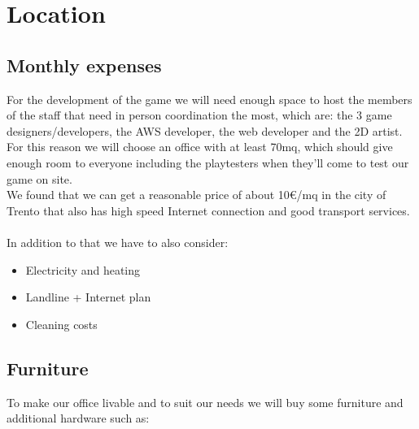 \section{Location}
\label{section:location}

\subsection{Monthly expenses}
For the development of the game we will need enough space to host the members of the staff that need in person coordination the most, which are: the 3 game designers/developers, the AWS developer, the web developer and the 2D artist. For this reason we will choose an office with at least 70mq, which should give enough room to everyone including the playtesters when they'll come to test our game on site. \\
We found that we can get a reasonable price of about 10€/mq in the city of Trento that also has high speed Internet connection and good transport services. \\\\
In addition to that we have to also consider:
\begin{itemize}
    \item Electricity and heating
    \item Landline + Internet plan
    \item Cleaning costs
\end{itemize}


\subsection{Furniture}

To make our office livable and to suit our needs we will buy some furniture and additional hardware such as:

